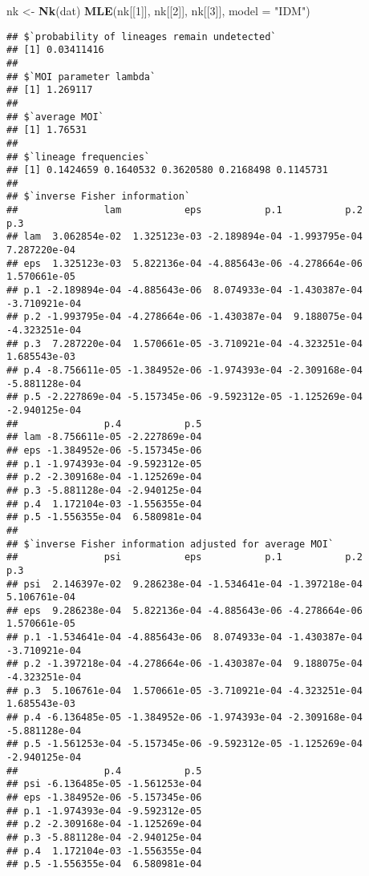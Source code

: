\documentclass[
]{article}
\newenvironment{Shaded}{\begin{snugshade}}{\end{snugshade}}
\newcommand{\AttributeTok}[1]{\textcolor[rgb]{0.13,0.29,0.53}{#1}}
\newcommand{\DecValTok}[1]{\textcolor[rgb]{0.00,0.00,0.81}{#1}}
\newcommand{\FunctionTok}[1]{\textcolor[rgb]{0.13,0.29,0.53}{\textbf{#1}}}
\newcommand{\NormalTok}[1]{#1}
\newcommand{\OtherTok}[1]{\textcolor[rgb]{0.56,0.35,0.01}{#1}}
\newcommand{\StringTok}[1]{\textcolor[rgb]{0.31,0.60,0.02}{#1}}
\begin{document}
\begin{Shaded}
\begin{Highlighting}[]
\NormalTok{nk }\OtherTok{\textless{}{-}} \FunctionTok{Nk}\NormalTok{(dat)}
\FunctionTok{MLE}\NormalTok{(nk[[}\DecValTok{1}\NormalTok{]], nk[[}\DecValTok{2}\NormalTok{]], nk[[}\DecValTok{3}\NormalTok{]], }\AttributeTok{model =} \StringTok{"IDM"}\NormalTok{)}
\end{Highlighting}
\end{Shaded}

\begin{verbatim}
## $`probability of lineages remain undetected`
## [1] 0.03411416
## 
## $`MOI parameter lambda`
## [1] 1.269117
## 
## $`average MOI`
## [1] 1.76531
## 
## $`lineage frequencies`
## [1] 0.1424659 0.1640532 0.3620580 0.2168498 0.1145731
## 
## $`inverse Fisher information`
##               lam           eps           p.1           p.2           p.3
## lam  3.062854e-02  1.325123e-03 -2.189894e-04 -1.993795e-04  7.287220e-04
## eps  1.325123e-03  5.822136e-04 -4.885643e-06 -4.278664e-06  1.570661e-05
## p.1 -2.189894e-04 -4.885643e-06  8.074933e-04 -1.430387e-04 -3.710921e-04
## p.2 -1.993795e-04 -4.278664e-06 -1.430387e-04  9.188075e-04 -4.323251e-04
## p.3  7.287220e-04  1.570661e-05 -3.710921e-04 -4.323251e-04  1.685543e-03
## p.4 -8.756611e-05 -1.384952e-06 -1.974393e-04 -2.309168e-04 -5.881128e-04
## p.5 -2.227869e-04 -5.157345e-06 -9.592312e-05 -1.125269e-04 -2.940125e-04
##               p.4           p.5
## lam -8.756611e-05 -2.227869e-04
## eps -1.384952e-06 -5.157345e-06
## p.1 -1.974393e-04 -9.592312e-05
## p.2 -2.309168e-04 -1.125269e-04
## p.3 -5.881128e-04 -2.940125e-04
## p.4  1.172104e-03 -1.556355e-04
## p.5 -1.556355e-04  6.580981e-04
## 
## $`inverse Fisher information adjusted for average MOI`
##               psi           eps           p.1           p.2           p.3
## psi  2.146397e-02  9.286238e-04 -1.534641e-04 -1.397218e-04  5.106761e-04
## eps  9.286238e-04  5.822136e-04 -4.885643e-06 -4.278664e-06  1.570661e-05
## p.1 -1.534641e-04 -4.885643e-06  8.074933e-04 -1.430387e-04 -3.710921e-04
## p.2 -1.397218e-04 -4.278664e-06 -1.430387e-04  9.188075e-04 -4.323251e-04
## p.3  5.106761e-04  1.570661e-05 -3.710921e-04 -4.323251e-04  1.685543e-03
## p.4 -6.136485e-05 -1.384952e-06 -1.974393e-04 -2.309168e-04 -5.881128e-04
## p.5 -1.561253e-04 -5.157345e-06 -9.592312e-05 -1.125269e-04 -2.940125e-04
##               p.4           p.5
## psi -6.136485e-05 -1.561253e-04
## eps -1.384952e-06 -5.157345e-06
## p.1 -1.974393e-04 -9.592312e-05
## p.2 -2.309168e-04 -1.125269e-04
## p.3 -5.881128e-04 -2.940125e-04
## p.4  1.172104e-03 -1.556355e-04
## p.5 -1.556355e-04  6.580981e-04
\end{verbatim}
\end{document}
